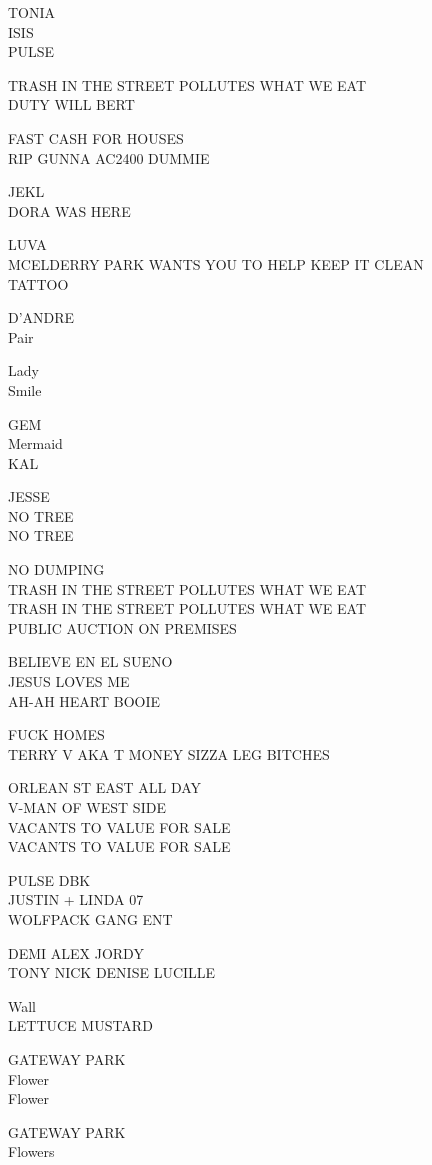 \documentclass[10pt,letterpaper]{article}
\begin{document}
TONIA\\
ISIS\\
PULSE

TRASH IN THE STREET POLLUTES WHAT WE EAT\\
DUTY WILL BERT

FAST CASH FOR HOUSES\\
RIP GUNNA AC2400 DUMMIE

JEKL\\
DORA WAS HERE

LUVA\\
MCELDERRY PARK WANTS YOU TO HELP KEEP IT CLEAN\\
TATTOO

D'ANDRE\\
Pair

Lady\\
Smile

GEM\\
Mermaid\\
KAL

JESSE\\
NO TREE\\
NO TREE

NO DUMPING\\
TRASH IN THE STREET POLLUTES WHAT WE EAT\\
TRASH IN THE STREET POLLUTES WHAT WE EAT\\
PUBLIC AUCTION ON PREMISES

BELIEVE EN EL SUENO\\
JESUS LOVES ME\\
AH{-}AH HEART BOOIE

FUCK HOMES\\
TERRY V AKA T MONEY SIZZA LEG BITCHES

ORLEAN ST EAST ALL DAY\\
V{-}MAN OF WEST SIDE\\
VACANTS TO VALUE FOR SALE\\
VACANTS TO VALUE FOR SALE

PULSE DBK\\
JUSTIN + LINDA 07\\
WOLFPACK GANG ENT

DEMI ALEX JORDY\\
TONY NICK DENISE LUCILLE

Wall\\
LETTUCE MUSTARD

GATEWAY PARK\\
Flower\\
Flower

GATEWAY PARK\\
Flowers
\end{document}
